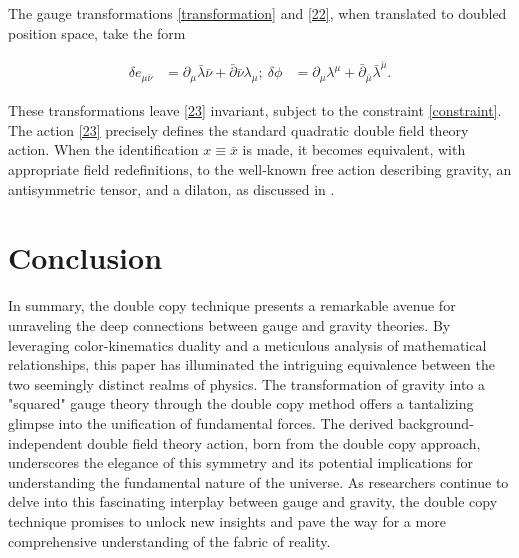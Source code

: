 \documentclass[13pt]{article}
\begin{document}
The gauge transformations \eqref{transformation} and \eqref{22}, when translated to doubled position space, take the form

\begin{equation}
\begin{aligned}
\delta e_{\mu \bar{\nu}} &= \partial_{\mu} \bar{\lambda}{\bar{\nu}} + \bar{\partial}{\bar{\nu}} \lambda_{\mu}; \
\delta \phi &= \partial_{\mu} \lambda^{\mu} + \bar{\partial}_{\bar{\mu}} \bar{\lambda}^{\bar{\mu}}.
\end{aligned}
\tag{25}
\end{equation}

These transformations leave \eqref{23} invariant, subject to the constraint \eqref{constraint}. The action \eqref{23} precisely defines the standard quadratic double field theory action. When the identification $x\equiv\bar x$ is made, it becomes equivalent, with appropriate field redefinitions, to the well-known free action describing gravity, an antisymmetric tensor, and a dilaton, as discussed in \cite{hull2009double}.

\section{Conclusion}
In summary, the double copy technique presents a remarkable avenue for unraveling the deep connections between gauge and gravity theories. By leveraging color-kinematics duality and a meticulous analysis of mathematical relationships, this paper has illuminated the intriguing equivalence between the two seemingly distinct realms of physics. The transformation of gravity into a "squared" gauge theory through the double copy method offers a tantalizing glimpse into the unification of fundamental forces. The derived background-independent double field theory action, born from the double copy approach, underscores the elegance of this symmetry and its potential implications for understanding the fundamental nature of the universe. As researchers continue to delve into this fascinating interplay between gauge and gravity, the double copy technique promises to unlock new insights and pave the way for a more comprehensive understanding of the fabric of reality.

\newpage


\end{document}
